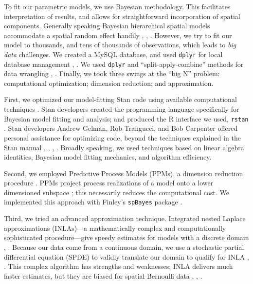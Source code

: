 To fit our parametric models, we use Bayesian methodology. This facilitates interpretation of results, and allows for straightforward incorporation of spatial components. Generally speaking Bayesian hierarchical spatial models accommodate a spatial random effect handily \citep{Gelman2014}, \citep{Banerjee2014}, \citep{Oliver2005}. However, we try to fit our model to thousands, and tens of thousands of observations, which leads to {\it big data} challenges. We created a MySQL database, and used \verb|dplyr| for local database management \citep{Wickham2016}, \citep{Tahaghoghi2006}. We used \verb|dplyr| and ``split-apply-combine'' methods for data wrangling \citep{Wickham2016}, \citep{wrangling}. Finally, we took three swings at the ``big N'' problem: computational optimization; dimension reduction; and approximation.

First, we optimized our model-fitting Stan code using available computational techniques \citep{Gelman2015}. Stan developers created the programming language specifically for Bayesian model fitting and analysis; and produced the R interface we used, \verb|rstan| \citep{rstan}. Stan developers Andrew Gelman, Rob Trangucci, and Bob Carpenter offered personal assistance for optimizing code, beyond the techniques explained in the Stan manual \citep{Gelman}, \citep{Trangucci}, \citep{Carpenter}, \citep{STANtheMan}. Broadly speaking, we used techniques based on linear algebra identities, Bayesian model fitting mechanics, and algorithm efficiency.

Second, we employed Predictive Process Models (PPMs), a dimension reduction procedure \citep{Finley2012}. PPMs project process realizations of a model onto a lower dimensioned subspace \citep{Banerjee2008}; this necessarily reduces the computational cost. We implemented this approach with Finley's \verb|spBayes| package \citep{Finley2013}.

Third, we tried an advanced approximation technique. Integrated nested Laplace approximations (INLAs)---a mathematically complex and computationally sophisticated procedure---give speedy estimates for models with a discrete domain \citep{Rue2009}, \citep{Rue2005}. Because our data come from a continuous domain, we use a stochastic partial differential equation (SPDE) to validly translate our domain to qualify for INLA \citep{Lindgren2011}, \citep{Lindstrom2016}. This complex algorithm has strengths and weaknesses; INLA delivers much faster estimates, but they are biased for spatial Bernoulli data \citep{Mondal2017}, \citep{Simpson2012b}, \citep{Rue2009}.

